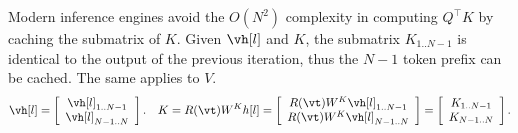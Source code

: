 
Modern inference engines avoid the $O(N^2)$ complexity in computing $Q^\top K$
by caching the submatrix of $K$.
Given
$\vh[l]$ and $K$,
the submatrix $K_{1..N-1}$ is identical to
the output of the previous iteration,
thus the $N-1$ token prefix can be cached.
The same applies to $V$.
\[
 \vh[l] =
 \left[
 \begin{array}{c}
  \vh[l]_{1..N-1} \\
  \vh[l]_{N-1..N}
 \end{array}
 \right].
 \quad
 K= R(\vt)W^Kh[l]
 =
 \left[
 \begin{array}{c}
  R(\vt)W^K\vh[l]_{1..N-1} \\
  R(\vt)W^K\vh[l]_{N-1..N}
 \end{array}
 \right]
 =
 \left[
 \begin{array}{c}
  K_{1..N-1} \\
  K_{N-1..N}
 \end{array}
 \right].
\]
